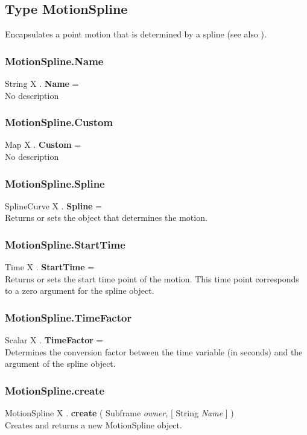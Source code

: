 \subsection{Type MotionSpline \label{T:MotionSpline}}
Encapsulates a point motion that is determined by a spline (see also ).

\subsubsection{MotionSpline.Name \label{F:MotionSpline:Name}}
String X . \textbf{Name} = \\
No description

\subsubsection{MotionSpline.Custom \label{F:MotionSpline:Custom}}
Map X . \textbf{Custom} = \\
No description

\subsubsection{MotionSpline.Spline \label{F:MotionSpline:Spline}}
SplineCurve X . \textbf{Spline} = \\
Returns or sets the  object that determines the motion.

\subsubsection{MotionSpline.StartTime \label{F:MotionSpline:StartTime}}
Time X . \textbf{StartTime} = \\
Returns or sets the start time point of the motion. This time point corresponds to a zero argument for the spline object.

\subsubsection{MotionSpline.TimeFactor \label{F:MotionSpline:TimeFactor}}
Scalar X . \textbf{TimeFactor} = \\
Determines the conversion factor between the time variable (in seconds) and the argument of the spline object.

\subsubsection{MotionSpline.create \label{F:MotionSpline:create}}
MotionSpline X . \textbf{create} ( Subframe \textit{owner},  [ String \textit{Name} ] ) \\
Creates and returns a new MotionSpline object.

